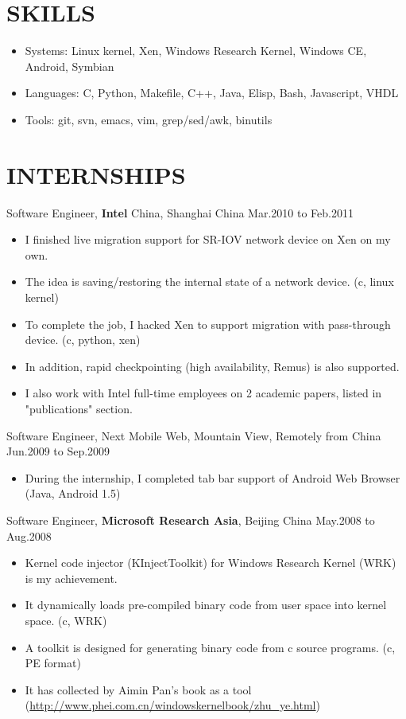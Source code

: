 \documentclass[11pt]{res} %
\begin{document}
\begin{resume}

\section{SKILLS}

\begin{itemize} \itemsep -2pt
\item Systems: Linux kernel, Xen, Windows Research Kernel, Windows CE, Android, Symbian
\item Languages: C, Python, Makefile, C++, Java, Elisp, Bash, Javascript, VHDL
\item Tools: git, svn, emacs, vim, grep/sed/awk, binutils
\end{itemize} 

\section{INTERNSHIPS}
Software Engineer, \textbf{Intel} China, Shanghai China \hfill Mar.2010 to Feb.2011
\begin{itemize} \itemsep -2pt
\item I finished live migration support for SR-IOV network device on Xen on my own.
\item The idea is saving/restoring the internal state of a network device. (c, linux kernel)
\item To complete the job, I hacked Xen to support migration with pass-through device. (c, python, xen)
\item In addition, rapid checkpointing (high availability, Remus) is also supported.
\item I also work with Intel full-time employees on 2 academic papers, listed in "publications" section.
\end{itemize} 

Software Engineer, Next Mobile Web, Mountain View, Remotely from China \\
\hspace*{\fill} Jun.2009 to Sep.2009
\begin{itemize} \itemsep -2pt
\item During the internship, I completed tab bar support of Android Web Browser (Java, Android 1.5)
\end{itemize} 

Software Engineer, \textbf{Microsoft Research Asia}, Beijing China \hfill May.2008 to Aug.2008
\begin{itemize} \itemsep -2pt
\item Kernel code injector (KInjectToolkit) for Windows Research Kernel (WRK) is my achievement.
\item It dynamically loads pre-compiled binary code from user space into kernel space. (c, WRK)
\item A toolkit is designed for generating binary code from c source programs. (c, PE format)
\item It has collected by Aimin Pan's book as a tool
  (\href{http://www.phei.com.cn/windowskernelbook/zhu\_ye.html}{http://www.phei.com.cn/windowskernelbook/zhu\_ye.html})
\end{itemize} 


\end{resume}
\end{document}
